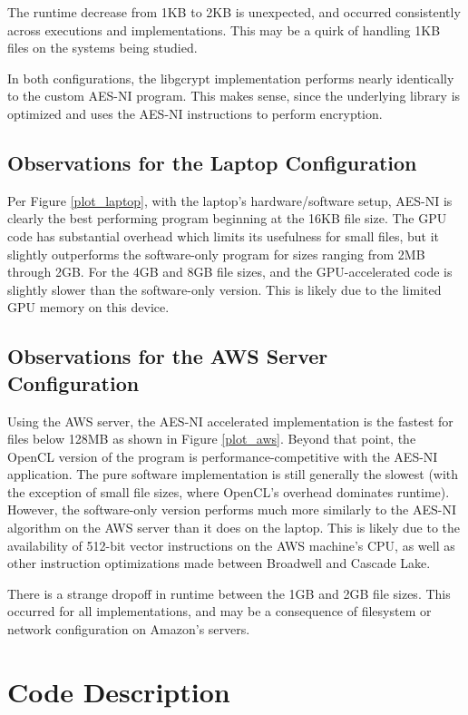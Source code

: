 \documentclass[a4paper,10pt]{article}
\begin{document}
The runtime decrease from 1KB to 2KB is unexpected, and occurred consistently across executions and implementations.  This may be a quirk of handling 1KB files on the systems being studied.

In both configurations, the libgcrypt implementation performs nearly identically to the custom AES-NI program.  This makes sense, since the underlying library is optimized and uses the AES-NI instructions to perform encryption.

\subsection{Observations for the Laptop Configuration}

Per Figure \ref{plot_laptop}, with the laptop's hardware/software setup, AES-NI is clearly the best performing program beginning at the 16KB  file size.  The GPU code has substantial overhead which limits its usefulness for small files, but it slightly outperforms the software-only program for sizes ranging from 2MB through 2GB. For the 4GB and 8GB file sizes, and the GPU-accelerated code is slightly slower than the software-only version.  This is likely due to the limited GPU memory on this device.

\subsection{Observations for the AWS Server Configuration}

Using the AWS server, the AES-NI accelerated implementation is the fastest for files below 128MB as shown in Figure \ref{plot_aws}.  Beyond that point, the OpenCL version of the program is performance-competitive with the AES-NI application.  The pure software implementation is still generally the slowest (with the exception of small file sizes, where OpenCL's overhead dominates runtime).  However, the software-only version performs much more similarly to the AES-NI algorithm on the AWS server than it does on the laptop.  This is likely due to the availability of 512-bit vector instructions on the AWS machine's CPU, as well as other instruction optimizations made between Broadwell and Cascade Lake.

There is a strange dropoff in runtime between the 1GB and 2GB file sizes.  This occurred for all implementations, and may be a consequence of filesystem or network configuration on Amazon's servers.

\section{Code Description}
\end{document}
